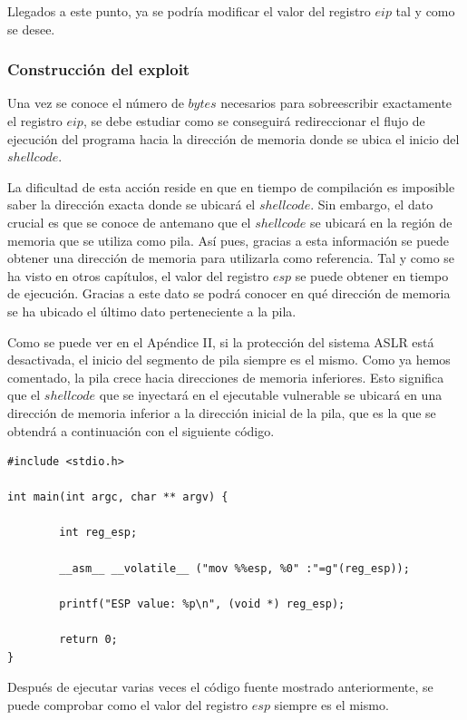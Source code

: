 \documentclass [titlepage, 12pt]{article}
\begin{document}
Llegados a este punto, ya se podr\'ia modificar el valor del registro $eip$ tal y como se desee.

\subsubsection{Construcci\'on del exploit}

Una vez se conoce el n\'umero de $bytes$ necesarios para sobreescribir exactamente el registro $eip$, se debe estudiar como se conseguir\'a redireccionar el flujo de ejecuci\'on del programa hacia la direcci\'on de memoria donde se ubica el inicio del $shellcode$.\bigskip

La dificultad de esta acci\'on reside en que en tiempo de compilaci\'on es imposible saber la direcci\'on exacta donde se ubicar\'a el $shellcode$. Sin embargo, el dato crucial es que se conoce de antemano que el $shellcode$ se ubicar\'a en la regi\'on de memoria que se utiliza como pila. As\'i pues, gracias a esta informaci\'on se puede obtener una direcci\'on de memoria para utilizarla como referencia. Tal y como se ha visto en otros cap\'itulos, el valor del registro $esp$ se puede obtener en tiempo de ejecuci\'on. Gracias a este dato se podr\'a conocer en qu\'e direcci\'on de memoria se ha ubicado el \'ultimo dato perteneciente a la pila. \bigskip

Como se puede ver en el Ap\'endice II, si la protecci\'on del sistema ASLR est\'a desactivada, el inicio del segmento de pila siempre es el mismo. Como ya hemos comentado, la pila crece hacia direcciones de memoria inferiores. Esto significa que el $shellcode$ que se inyectar\'a en el ejecutable vulnerable se ubicar\'a en una direcci\'on de memoria inferior a la direcci\'on inicial de la pila, que es la que se obtendr\'a a continuaci\'on con el siguiente c\'odigo.

\lstset{language=C++,caption=Obteniendo el valor del registro ESP}
\begin{lstlisting}
#include <stdio.h>

int main(int argc, char ** argv) {

        int reg_esp;

        __asm__ __volatile__ ("mov %%esp, %0" :"=g"(reg_esp));

        printf("ESP value: %p\n", (void *) reg_esp);

        return 0;
}
\end{lstlisting}


Despu\'es de ejecutar varias veces el c\'odigo fuente mostrado anteriormente, se puede comprobar como el valor del registro $esp$ siempre es el mismo.
\end{document}
